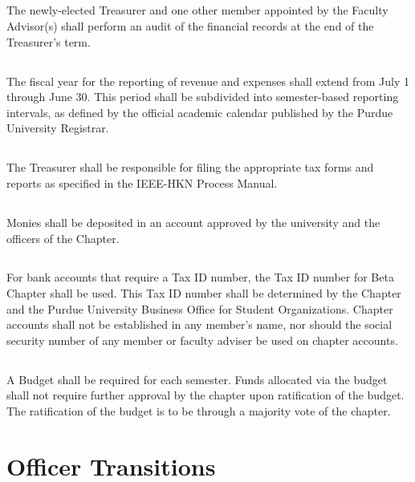 \documentclass[10pt, oneside]{article}
\begin{document}
\subsection{}
The newly-elected Treasurer and one other member appointed by the Faculty Advisor(s) shall perform an audit of the financial records at the end of the Treasurer’s term.

\subsection{}
The fiscal year for the reporting of revenue and expenses shall extend from July 1 through June 30. This period shall be subdivided into semester-based reporting intervals, as defined by the official academic calendar published by the Purdue University Registrar.

\subsection{}
The Treasurer shall be responsible for filing the appropriate tax forms and reports as specified in the IEEE-HKN Process Manual.

\subsection{}
Monies shall be deposited in an account approved by the university and the officers of the Chapter.

\subsection{}
For bank accounts that require a Tax ID number, the Tax ID number for Beta Chapter shall be used. This Tax ID number shall be determined by the Chapter and the Purdue University Business Office for Student Organizations. Chapter accounts shall not be established in any member’s name, nor should the social security number of any member or faculty adviser be used on chapter accounts.

\subsection{}
A Budget shall be required for each semester. Funds allocated via the budget shall not require further approval by the chapter upon ratification of the budget. The ratification of the budget is to be through a majority vote of the chapter.

\section{Officer Transitions}
\end{document}
